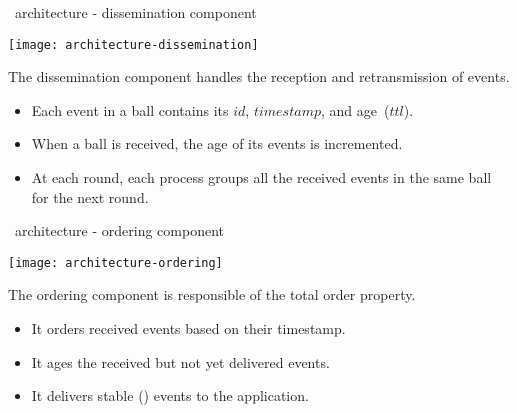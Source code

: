 \begin{frame}{\EPTO \ architecture - dissemination component}


\centering
\texttt{[image: architecture-dissemination]}

\vspace{-1mm}

\noindent The dissemination component handles the reception and retransmission of events. 

\begin{itemize}

\item Each event in a ball contains its $id$, $timestamp$, and age~($ttl$).

\item When a ball is received, the age of its events is incremented.

\item At each round, each process groups all the received events in the same ball for the next round.

\end{itemize}

\end{frame}


\begin{frame}{\EPTO \ architecture - ordering component}

\vspace{-6.5mm}

\centering
\texttt{[image: architecture-ordering]}
  
The ordering component is responsible of the total order property. 
\begin{itemize}

\item It orders received events based on their timestamp.

\item It ages the received but not yet delivered events.

\item It delivers stable () events to the application.

\end{itemize}

\end{frame}


